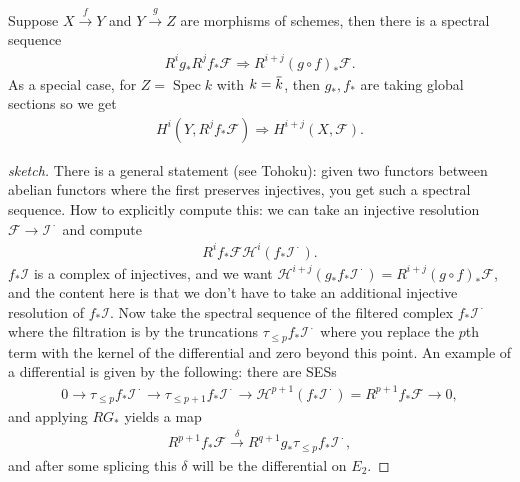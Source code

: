 \begin{corollary}

Suppose \(X \xrightarrow{f} Y\) and \(Y \xrightarrow{g} Z\) are
morphisms of schemes, then there is a spectral sequence
\begin{align*}  
R^i g_* R^j f_* \mathcal{F} \Rightarrow R^{i+j}(g\circ f)_* \mathcal{F}
.\end{align*}
As a special case, for \(Z = \operatorname{Spec}k\) with
\(k=\mkern 1.5mu\overline{\mkern-1.5muk\mkern-1.5mu}\mkern 1.5mu\), then
\(g_*, f_*\) are taking global sections so we get
\begin{align*}  
H^i(Y, R^j f_* \mathcal{F} ) \Rightarrow H^{i+j}(X, \mathcal{F})
.\end{align*}

\end{corollary}

\begin{proof}[sketch]

There is a general statement (see Tohoku): given two functors between
abelian functors where the first preserves injectives, you get such a
spectral sequence. How to explicitly compute this: we can take an
injective resolution \(\mathcal{F}\to \mathcal{I}^{\,\cdot\,}\) and
compute
\begin{align*}  
R^i f_* \mathcal{F} \mathcal{H}^i(f_* \mathcal{I}^{\,\cdot\,})
.\end{align*}
\(f_* \mathcal{I}\) is a complex of injectives, and we want
\(\mathcal{H}^{i+j}(g_* f_* \mathcal{I}^{\,\cdot\,}) = R^{i+j}(g\circ f)_* \mathcal{F}\),
and the content here is that we don't have to take an additional
injective resolution of \(f_* \mathcal{I}\). Now take the spectral
sequence of the filtered complex \(f_* \mathcal{I}^{\,\cdot\,}\) where
the filtration is by the truncations
\(\tau_{\leq p}f_* \mathcal{I}^{\,\cdot\,}\) where you replace the
\(p\)th term with the kernel of the differential and zero beyond this
point. An example of a differential is given by the following: there are
SESs
\begin{align*}  
0 \to
\tau_{\leq p} f_* \mathcal{I}^{\,\cdot\,}
\to
\tau_{\leq p+1} f_* \mathcal{I}^{\,\cdot\,}
\to
\mathcal{H}^{p+1}(f_* \mathcal{I}^{\,\cdot\,})  = R^{p+1} f_* \mathcal{F}
\to 
0
,\end{align*}
and applying \(RG_*\) yields a map
\begin{align*}  
R^{p+1} f_* \mathcal{F}
\xrightarrow{\delta}
R^{q+1} g_* \tau_{\leq p}f_* \mathcal{I}^{\,\cdot\,}
,\end{align*}
and after some splicing this \(\delta\) will be the differential on
\(E_2\).

\end{proof}

